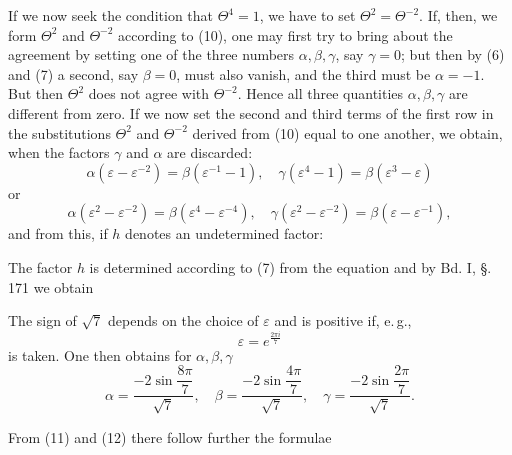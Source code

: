 If we now seek the condition that $\Theta^4 = 1$,
we have to set $\Theta^2 = \Theta^{-2}$. If, then, we form $\Theta^2$ and $\Theta^{-2}$
according to (10), one may first try to bring about the agreement
by setting one of the three numbers $\alpha, \beta, \gamma$, say $\gamma = 0$;
but then by (6) and (7) a second, say
$\beta = 0$, must also vanish, and the third must be $\alpha = -1$. But then $\Theta^2$ does not
agree with $\Theta^{-2}$. Hence all three quantities $\alpha, \beta, \gamma$
are different from zero. If we now set the second and third
terms of the first row in the substitutions
$\Theta^2$ and $\Theta^{-2}$ derived from (10) equal to one another, we obtain, when the factors
$\gamma$ and $\alpha$ are discarded:
\[
\alpha(\varepsilon - \varepsilon^{-2}) = \beta(\varepsilon^{-1} - 1), \quad \gamma(\varepsilon^4 - 1) = \beta(\varepsilon^3 - \varepsilon)
\]
or
\[
\alpha(\varepsilon^2 - \varepsilon^{-2}) = \beta(\varepsilon^4 - \varepsilon^{-4}), \quad \gamma(\varepsilon^2 - \varepsilon^{-2}) = \beta(\varepsilon - \varepsilon^{-1}),
\]
and from this, if $h$ denotes an undetermined factor:

The factor $h$ is determined according to (7) from the equation
and by Bd. I, \S.\,171 we obtain

The sign of $\sqrt{7}$ depends on the choice of $\varepsilon$ and
is positive if, e.\,g.,
\[
\varepsilon = e^{\frac{2\pi i}{7}}
\]
is taken. One then obtains for $\alpha, \beta, \gamma$
\[
\alpha = \frac{-2\sin\dfrac{8\pi}{7}}{\sqrt{7}}, \quad \beta = \frac{-2\sin\dfrac{4\pi}{7}}{\sqrt{7}}, \quad \gamma = \frac{-2\sin\dfrac{2\pi}{7}}{\sqrt{7}}.
\]

From (11) and (12) there follow further the formulae

